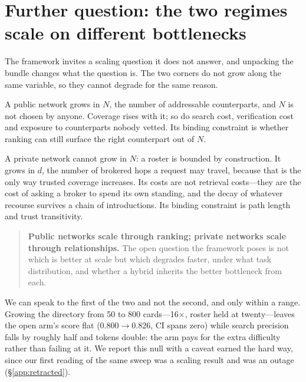 \section{Further question: the two regimes scale on different bottlenecks}
\label{sec:scaling}

The framework invites a scaling question it does not answer, and unpacking the bundle
changes what the question is. The two corners do not grow along the same variable, so they
cannot degrade for the same reason.

A public network grows in $N$, the number of addressable counterparts, and $N$ is not
chosen by anyone. Coverage rises with it; so do search cost, verification cost and
exposure to counterparts nobody vetted. Its binding constraint is whether ranking can still
surface the right counterpart out of $N$.

A private network cannot grow in $N$: a roster is bounded by construction. It grows in
$d$, the number of brokered hops a request may travel, because that is the only way trusted
coverage increases. Its costs are not retrieval costs---they are the cost of asking a
broker to spend its own standing, and the decay of whatever recourse survives a chain of
introductions. Its binding constraint is path length and trust transitivity.

\begin{quote}
\textbf{Public networks scale through ranking; private networks scale through
relationships.} The open question the framework poses is not which is better at scale but
which degrades faster, under what task distribution, and whether a hybrid inherits the
better bottleneck from each.
\end{quote}

We can speak to the first of the two and not the second, and only within a range. Growing
the directory from 50 to 800 cards---16$\times$, roster held at twenty---leaves the open
arm's score flat ($0.800 \to 0.826$, CI spans zero) while search precision falls by roughly
half and tokens double: the arm pays for the extra difficulty rather than failing at it. We
report this null with a caveat earned the hard way, since our first reading of the same
sweep was a scaling result and was an outage (\S\ref{app:retracted}).

